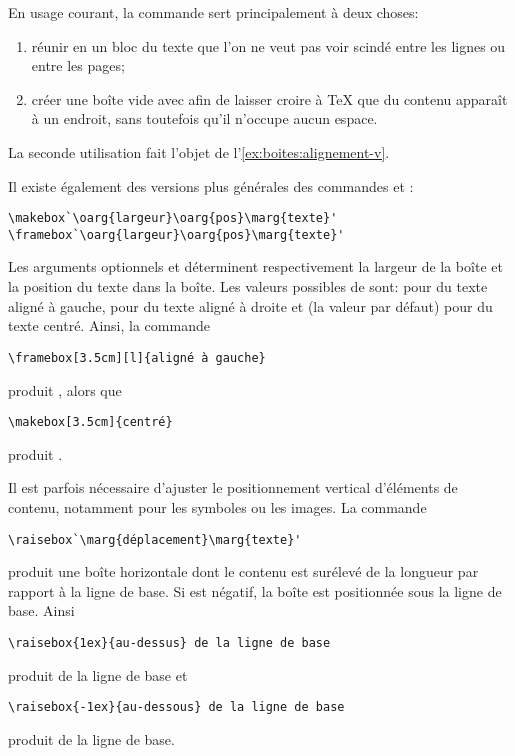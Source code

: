 \begin{conseil}
  En usage courant, la commande \cmd{\mbox} sert principalement à deux
  choses:
  \begin{enumerate}
  \item réunir en un bloc du texte que l'on ne veut pas voir scindé
    entre les lignes ou entre les pages;
  \item \label{item:boites:mbox} créer une boîte vide avec
     afin de laisser croire à {\TeX} que du contenu
    apparaît à un endroit, sans toutefois qu'il n'occupe aucun espace.
  \end{enumerate}
  La seconde utilisation fait l'objet de
  l'\autoref{ex:boites:alignement-v}.
\end{conseil}

Il existe également des versions plus générales des commandes
\cmd{\mbox} et \cmd{\fbox}:
\begin{lstlisting}
\makebox`\oarg{largeur}\oarg{pos}\marg{texte}'
\framebox`\oarg{largeur}\oarg{pos}\marg{texte}'
\end{lstlisting}
Les arguments optionnels  et  déterminent
respectivement la largeur de la boîte et la position du texte
dans la boîte. Les valeurs possibles de  sont:  pour
du texte aligné à gauche,  pour du texte aligné à droite et
 (la valeur par défaut) pour du texte centré. Ainsi, la commande
\begin{lstlisting}
\framebox[3.5cm][l]{aligné à gauche}
\end{lstlisting}
produit , alors que
\begin{lstlisting}
\makebox[3.5cm]{centré}
\end{lstlisting}
produit .

Il est parfois nécessaire d'ajuster le positionnement vertical
d'éléments de contenu, notamment pour les symboles ou les images. La
commande
\begin{lstlisting}
\raisebox`\marg{déplacement}\marg{texte}'
\end{lstlisting}
produit une boîte horizontale dont le contenu  est
surélevé de la longueur  par rapport à la ligne de
base. Si  est négatif, la boîte est positionnée sous
la ligne de base. Ainsi
\begin{lstlisting}
\raisebox{1ex}{au-dessus} de la ligne de base
\end{lstlisting}
produit  \raisebox{1ex}{au-dessus} de la ligne de base et
\begin{lstlisting}
\raisebox{-1ex}{au-dessous} de la ligne de base
\end{lstlisting}
produit \raisebox{-1ex}{au-dessous} de la ligne de base.

